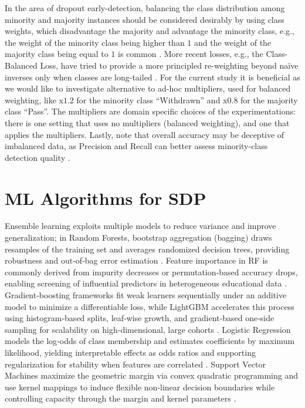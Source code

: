 \documentclass[ %
                    author={Carlos Duran Calle},
                supervisor={Dr. Felipe Campelo},
                    degree={MSc},
                     title={Comparative Machine Learning Analysis for Student Dropout Prediction in a Virtual Learning Environment},
                  subtitle={Incorporating Student Engagement and Socio-Economic Features},
                      type={},
                      year={2025}]{dissertation}
\begin{document}
In the area of dropout early-detection, balancing the class distribution among minority and majority instances should be considered desirably by using class weights, which disadvantage the majority and advantage the minority class, e.g., the weight of the minority class being higher than $1$ and the weight of the majority class being equal to $1$ is common \cite{hlosta_ouroboros_2017}. More recent losses, e.g., the Class-Balanced Loss, have tried to provide a more principled re-weighting beyond naïve inverses only when classes are long-tailed \cite{cui_class-balanced_2019}. For the current study it is beneficial as we would like to investigate alternative to ad-hoc multipliers, used for balanced weighting, like x$1.2$ for the minority class “Withdrawn” and x$0.8$ for the majority class “Pass”. The multipliers are domain specific choices of the experimentations: there is one setting that uses no multipliers (balanced weighting), and one that applies the multipliers. Lastly, note that overall accuracy may be deceptive of imbalanced data, as Precision and Recall can better assess minority-class detection quality \cite{saito_precision-recall_2015}.

\section{ML Algorithms for SDP}
Ensemble learning exploits multiple models to reduce variance and improve generalization; in Random Forests, bootstrap aggregation (bagging) draws resamples of the training set and averages randomized decision trees, providing robustness and out‑of‑bag error estimation \cite{breiman_bagging_1996} \cite{breiman_rf_2001}. Feature importance in RF is commonly derived from impurity decreases or permutation‑based accuracy drops, enabling screening of influential predictors in heterogeneous educational data \cite{breiman_rf_2001}. Gradient‑boosting frameworks fit weak learners sequentially under an additive model to minimize a differentiable loss, while LightGBM accelerates this process using histogram‑based splits, leaf‑wise growth, and gradient‑based one‑side sampling for scalability on high‑dimensional, large cohorts \cite{friedman_gbm_2001} \cite{ke_lightgbm_2017}. Logistic Regression models the log‑odds of class membership and estimates coefficients by maximum likelihood, yielding interpretable effects as odds ratios and supporting regularization for stability when features are correlated \cite{cox_regression_1958} \cite{nelder_generalized_1972}. Support Vector Machines maximize the geometric margin via convex quadratic programming and use kernel mappings to induce flexible non‑linear decision boundaries while controlling capacity through the margin and kernel parameters \cite{cortes_svm_1995}. 
\end{document}

